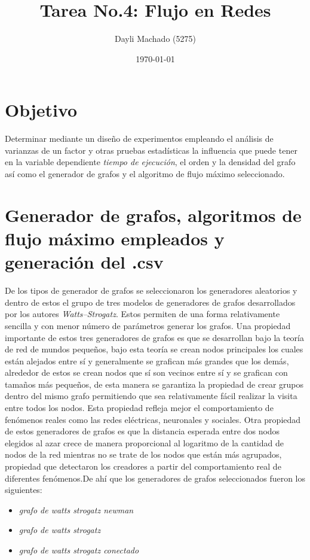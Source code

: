 \documentclass{article}
\begin{document}
\title{Tarea No.4: Flujo en Redes}
\author{Dayli Machado (5275)}
\date{\today}
\maketitle

\section{Objetivo}

Determinar mediante un diseño de experimentos empleando el análisis de varianzas de un factor y otras pruebas estadísticas la influencia que puede tener en la variable dependiente\textit{ tiempo de ejecución}, el  orden y la densidad del grafo así como el generador de grafos y el algoritmo de flujo máximo seleccionado.

\section{Generador de grafos, algoritmos de flujo máximo empleados y generación del .csv }

De los tipos de generador de grafos se seleccionaron los generadores aleatorios y dentro de estos el grupo de tres modelos de generadores de grafos desarrollados por los autores \textit{Watts–Strogatz}\cite{generadoraws}. Estos permiten de una forma relativamente sencilla y con menor número de parámetros generar los grafos. Una propiedad importante de estos tres generadores de grafos es que se desarrollan bajo la teoría de red de mundos pequeños, bajo esta teoría se crean nodos principales los cuales están alejados entre sí y generalmente se grafican más grandes que los demás, alrededor de estos se crean nodos que sí son vecinos entre sí y se grafican con tamaños más pequeños, de esta manera se garantiza la propiedad de crear grupos dentro del mismo grafo permitiendo que sea relativamente fácil realizar la visita entre todos los nodos. Esta propiedad refleja mejor el comportamiento de fenómenos reales como las redes eléctricas, neuronales y sociales. Otra propiedad de estos generadores de grafos es que la distancia esperada entre dos nodos elegidos al azar crece de manera proporcional al logaritmo de la cantidad de nodos de la red mientras no se trate de los nodos que están más agrupados, propiedad que detectaron los creadores a partir del comportamiento real de diferentes fenómenos\cite{wys}.De ahí que los generadores de grafos seleccionados fueron los siguientes:

\begin{itemize}
\item \textit{grafo de watts strogatz newman }
\item \textit{grafo de watts strogatz }
\item \textit{grafo de watts strogatz conectado}
\end{itemize}
%
\end{document}
